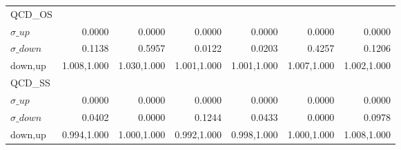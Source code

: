 \documentclass[11pt,oneside,a4paper]{article}
\begin{document}
\begin{table}
\begin{tabular}{lrrrrrr}
\hline
QCD\_OS &  &  &  &  &  &  \\
$\sigma\_up$ & 0.0000 & 0.0000 & 0.0000 & 0.0000 & 0.0000 & 0.0000 \\
$\sigma\_down$ & 0.1138 & 0.5957 & 0.0122 & 0.0203 & 0.4257 & 0.1206 \\
down,up & 1.008,1.000 & 1.030,1.000 & 1.001,1.000 & 1.001,1.000 & 1.007,1.000 & 1.002,1.000 \\

\hline
QCD\_SS &  &  &  &  &  &  \\
$\sigma\_up$ & 0.0000 & 0.0000 & 0.0000 & 0.0000 & 0.0000 & 0.0000 \\
$\sigma\_down$ & 0.0402 & 0.0000 & 0.1244 & 0.0433 & 0.0000 & 0.0978 \\
down,up & 0.994,1.000 & 1.000,1.000 & 0.992,1.000 & 0.998,1.000 & 1.000,1.000 & 1.008,1.000 \\

\hline
\end{tabular}
\end{table}
\end{document}

